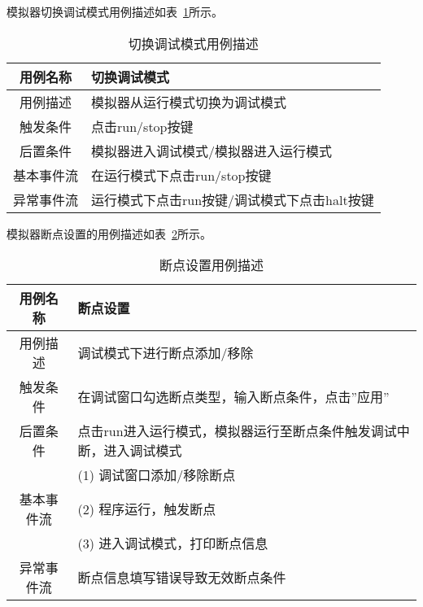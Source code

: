 模拟器切换调试模式用例描述如表~\ref{tab:yongli2}所示。
\begin{table}[h]
  \centering
  \caption{切换调试模式用例描述}
  \label{tab:yongli2}
  \renewcommand\arraystretch{1.1}
  \begin{tabular}{cl}
    \toprule
用例名称	& 切换调试模式\\
    \midrule
用例描述	& 模拟器从运行模式切换为调试模式\\ \hline
触发条件	& 点击run/stop按键\\ \hline
后置条件	& 模拟器进入调试模式/模拟器进入运行模式\\ \hline
基本事件流	& 在运行模式下点击run/stop按键\\ \hline
异常事件流	& 运行模式下点击run按键/调试模式下点击halt按键\\
    \bottomrule
  \end{tabular}
\end{table}


模拟器断点设置的用例描述如表~\ref{tab:yongli3}所示。
\begin{table}[h]
  \centering
  \caption{断点设置用例描述}
  \label{tab:yongli3}
  \renewcommand\arraystretch{1.1}
  \begin{tabular}{cl}
    \toprule
用例名称	& 断点设置\\
    \midrule
用例描述	& \multicolumn{1}{p{9cm}}{调试模式下进行断点添加/移除}\\ \hline
触发条件	& \multicolumn{1}{m{9cm}}{在调试窗口勾选断点类型，输入断点条件，点击”应用”}\\ \hline
后置条件	& \multicolumn{1}{m{9cm}}{点击run进入运行模式，模拟器运行至断点条件触发调试中断，进入调试模式}\\ \hline
 & \multicolumn{1}{m{9cm}}{(1)	调试窗口添加/移除断点}\\
 基本事件流 & \multicolumn{1}{m{9cm}}{(2)	程序运行，触发断点}\\
 & \multicolumn{1}{m{9cm}}{(3)	进入调试模式，打印断点信息}\\ \hline
异常事件流	& \multicolumn{1}{m{9cm}}{断点信息填写错误导致无效断点条件}\\
    \bottomrule
  \end{tabular}
\end{table}



